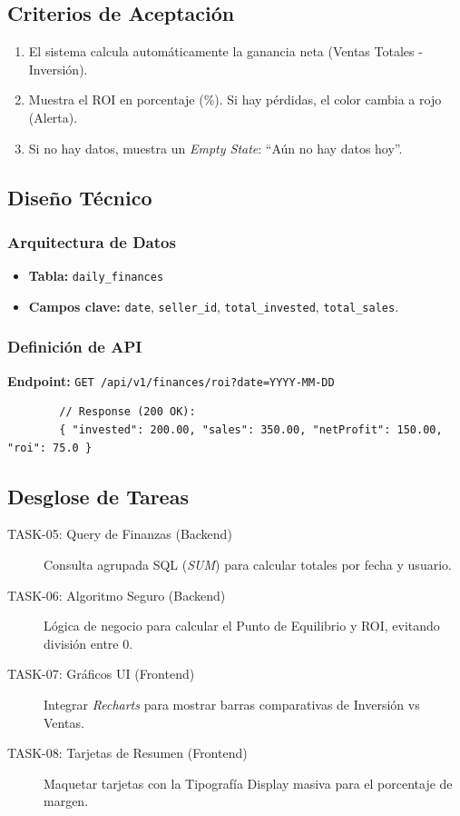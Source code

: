 \documentclass[11pt, letterpaper]{article}
\begin{document}
    \subsection{Criterios de Aceptación}
    \begin{enumerate}[label=\bfseries\arabic*.]
        \item El sistema calcula automáticamente la ganancia neta (Ventas Totales - Inversión).
        \item Muestra el ROI en porcentaje (\%). Si hay pérdidas, el color cambia a rojo (Alerta).
        \item Si no hay datos, muestra un \textit{Empty State}: ``Aún no hay datos hoy''.
    \end{enumerate}
   
    \subsection{Diseño Técnico}
    \subsubsection*{Arquitectura de Datos}
    \begin{itemize}
        \item \textbf{Tabla:} \texttt{daily\_finances}
        \item \textbf{Campos clave:} \texttt{date}, \texttt{seller\_id}, \texttt{total\_invested}, \texttt{total\_sales}.
    \end{itemize}
   
    \subsubsection*{Definición de API}
    \textbf{Endpoint:} \texttt{GET /api/v1/finances/roi?date=YYYY-MM-DD}
    \begin{verbatim}
        // Response (200 OK):
        { "invested": 200.00, "sales": 350.00, "netProfit": 150.00, "roi": 75.0 }
    \end{verbatim}
   
    \subsection{Desglose de Tareas}
    \begin{description}
        \item[TASK-05: Query de Finanzas (Backend)] Consulta agrupada SQL (\textit{SUM}) para calcular totales por fecha y usuario.
        \item[TASK-06: Algoritmo Seguro (Backend)] Lógica de negocio para calcular el Punto de Equilibrio y ROI, evitando división entre 0.
        \item[TASK-07: Gráficos UI (Frontend)] Integrar \textit{Recharts} para mostrar barras comparativas de Inversión vs Ventas.
        \item[TASK-08: Tarjetas de Resumen (Frontend)] Maquetar tarjetas con la Tipografía Display masiva para el porcentaje de margen.
    \end{description}
\end{document}
